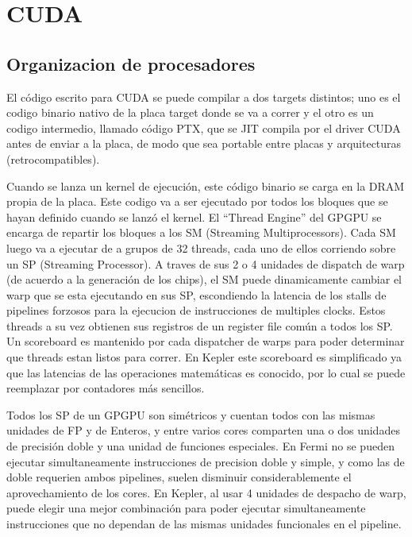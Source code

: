 \section{CUDA}

\subsection{Organizacion de procesadores}

El c\'odigo escrito para CUDA se puede compilar a dos targets distintos; uno es
el codigo binario nativo de la placa target donde se va a correr y el otro es un
codigo intermedio, llamado c\'odigo PTX, que se JIT compila por el driver CUDA
antes de enviar a la placa, de modo que sea portable entre placas y arquitecturas
(retrocompatibles).

Cuando se lanza un kernel de ejecuci\'on, este c\'odigo binario se carga en la DRAM propia
de la placa. Este codigo va a ser ejecutado por todos los bloques que se hayan definido cuando
se lanz\'o el kernel. El ``Thread Engine'' del GPGPU se encarga de repartir los bloques a los
SM (Streaming Multiprocessors). Cada SM luego va a ejecutar de a grupos de 32 threads, cada uno
de ellos corriendo sobre un SP (Streaming Processor). A traves de sus 2 o 4 unidades de dispatch de warp
(de acuerdo a la generaci\'on de los chips), el SM puede dinamicamente cambiar el warp que se esta ejecutando en sus SP,
escondiendo la latencia de los stalls de pipelines forzosos para la ejecucion de instrucciones de multiples clocks.
Estos threads a su vez obtienen sus registros de un register file com\'un a todos los SP. Un scoreboard
es mantenido por cada dispatcher de warps para poder determinar que threads estan listos para correr. En Kepler
este scoreboard es simplificado ya que las latencias de las operaciones matem\'aticas es conocido, por
lo cual se puede reemplazar por contadores m\'as sencillos. ~\cite{NvidiaKepler}

Todos los SP de un GPGPU son sim\'etricos y cuentan todos con las mismas unidades de FP y de Enteros,
y entre varios cores comparten una o dos unidades de precisi\'on doble y una unidad de funciones especiales.
En Fermi no se pueden ejecutar simultaneamente instrucciones de precision doble y simple, y como
las de doble requerien ambos pipelines, suelen disminuir considerablemente el aprovechamiento
de los cores. En Kepler, al usar 4 unidades de despacho de warp, puede elegir una mejor
combinaci\'on para poder ejecutar simultaneamente instrucciones que no dependan de las mismas
unidades funcionales en el pipeline. ~\cite{NvidiaKepler}

